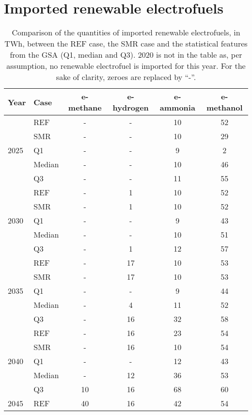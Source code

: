\section{Imported renewable electrofuels}
\label{app:UQ_electrofuels}
\begin{table}[htbp!]
\caption{Comparison of the quantities of imported renewable electrofuels, in TWh, between the REF case, the SMR case and the statistical features from the \gls{GSA} (\ie Q1, median and Q3). 2020 is not in the table as, per assumption, no renewable electrofuel is imported for this year. For the sake of clarity, zeroes are replaced by ``-''.}
\label{tab:uq_ref_smr_med}
\begin{minipage}{\linewidth}
\centering
\begin{tabular}{l l | c c c c}
\toprule
\textbf{Year} & \textbf{Case} & \textbf{e-methane} & \textbf{e-hydrogen} & \textbf{e-ammonia} & \textbf{e-methanol}\\	
\toprule							
\multirow{5}{*}{2025}
 & REF & - & - & 10 & 52\\
 & SMR & - & -  & 10 & 29\\
 \cmidrule{2 - 6}
 & Q1 & - & - & 9 & 2\\
 & Median & - & - & 10 & 46\\
 & Q3 & - & - & 11 & 55\\
\toprule
\multirow{5}{*}{2030}
 & REF & - & 1 & 10 & 52\\
 & SMR & - & 1 & 10 & 52\\
 \cmidrule{2 - 6}
 & Q1 & - & - & 9 & 43\\
 & Median & - & - & 10 & 51\\
 & Q3 & - & 1 & 12 & 57\\
\toprule
\multirow{5}{*}{2035}
 & REF & - & 17 & 10 & 53\\
 & SMR & - & 17 & 10 & 53\\
 \cmidrule{2 - 6}
 & Q1 & - & - & 9 & 44\\
 & Median & - & 4 & 11 & 52\\
 & Q3 & - & 16 & 32 & 58\\
\toprule
\multirow{5}{*}{2040}
 & REF & - & 16 & 23 & 54\\
 & SMR & - & 16 & 10 & 54\\
 \cmidrule{2 - 6}
 & Q1 & - & - & 12 & 43\\
 & Median & - & 12 & 36 & 53\\
 & Q3 & 10 & 16 & 68 & 60\\
\toprule
\multirow{5}{*}{2045}
 & REF & 40 & 16 & 42 & 54\\

\end{tabular}
\end{minipage}
\end{table}
